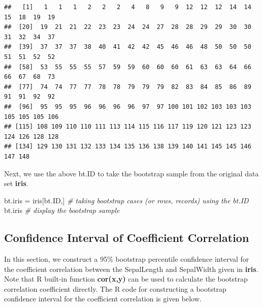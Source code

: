 \documentclass[
]{book}
\newenvironment{Shaded}{\begin{snugshade}}{\end{snugshade}}
\newcommand{\CommentTok}[1]{\textcolor[rgb]{0.56,0.35,0.01}{\textit{#1}}}
\newcommand{\NormalTok}[1]{#1}
\newcommand{\OtherTok}[1]{\textcolor[rgb]{0.56,0.35,0.01}{#1}}
\begin{document}
\begin{verbatim}
##   [1]   1   1   1   2   2   2   4   8   9   9  12  12  12  14  14  15  18  19  19
##  [20]  19  21  21  22  23  23  24  24  27  28  28  29  29  30  30  31  32  34  37
##  [39]  37  37  37  38  40  41  42  42  45  46  46  48  50  50  50  51  51  52  52
##  [58]  53  55  55  55  57  59  59  60  60  60  61  63  63  64  66  66  67  68  73
##  [77]  74  74  77  77  78  78  79  79  79  82  83  84  85  86  89  91  91  92  92
##  [96]  95  95  95  96  96  96  96  97  97 100 101 102 103 103 103 105 105 105 106
## [115] 108 109 110 110 111 113 114 115 116 117 119 120 121 123 123 124 126 128 128
## [134] 129 130 131 132 133 134 135 136 138 139 140 141 145 145 146 147 148
\end{verbatim}

Next, we use the above bt.ID to take the bootstrap sample from the original data set \textbf{iris}.

\begin{Shaded}
\begin{Highlighting}[]
\NormalTok{bt.iris }\OtherTok{=}\NormalTok{ iris[bt.ID,]   }\CommentTok{\# taking bootstrap cases (or rows, records) using the bt.ID}
\NormalTok{bt.iris                  }\CommentTok{\# display the bootstrap sample}
\end{Highlighting}
\end{Shaded}

\hypertarget{confidence-interval-of-coefficient-correlation}{%
\subsection{Confidence Interval of Coefficient Correlation}\label{confidence-interval-of-coefficient-correlation}}

In this section, we construct a 95\% bootstrap percentile confidence interval for the coefficient correlation between the SepalLength and SepalWidth given in \textbf{iris}. Note that R built-in function \textbf{cor(x,y)} can be used to calculate the bootstrap correlation coefficient directly. The R code for constructing a bootstrap confidence interval for the coefficient correlation is given below.
\end{document}
